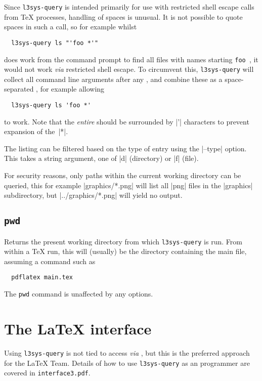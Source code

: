 \documentclass{l3doc}
\begin{document}
\begin{documentation}
Since \texttt{l3sys-query} is intended primarily for use with restricted shell
escape calls from \TeX{} processes, handling of spaces is unusual. It is not
possible to quote spaces in such a call, so for example whilst
\begin{verbatim}
  l3sys-query ls "'foo *'"
\end{verbatim}
does work from the command prompt to find all files with names starting
\verb*|foo |, it would not work \emph{via} restricted shell escape. To
circumvent this, \texttt{l3sys-query} will collect all command line arguments
after any , and combine these as a space-separated ,
for example allowing
\begin{verbatim}
  l3sys-query ls 'foo *'
\end{verbatim}
to work. Note that the \emph{entire}  should be surrounded by |'|
characters to prevent expansion of the~|*|.

The listing can be filtered based on the type of entry using the |--type|
option. This takes a string argument, one of |d| (directory) or |f| (file).

For security reasons, only paths within the current working directory can be
queried, this for example |graphics/*.png| will list all |png| files in the
|graphics| subdirectory, but |../graphics/*.png| will yield no output.

\subsection{\texttt{pwd}}

Returns the present working directory from which \texttt{l3sys-query} is run.
From within a \TeX{} run, this will (usually) be the directory containing the
main file, assuming a command such as
\begin{verbatim}
  pdflatex main.tex
\end{verbatim}
The \texttt{pwd} command is unaffected by any options.

\section{The \LaTeX{} interface}

Using \texttt{l3sys-query} is not tied to access \emph{via} , but
this is the preferred approach for the \LaTeX{} Team. Details of how to use
\texttt{l3sys-query} as an  programmer are covered in
\texttt{interface3.pdf}.

\end{documentation}

\PrintIndex
\end{document}
